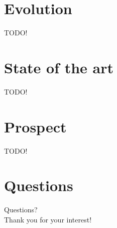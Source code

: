 \documentclass[10pt]{beamer}
\begin{document}
\section{Evolution}
\begin{frame}
	TODO!	
\end{frame}

\section{State of the art}
\begin{frame}
	TODO!	
\end{frame}

\section{Prospect}
\begin{frame}
	TODO!	
\end{frame}

\section{Questions}
\begin{frame}[standout]
	Questions? \\
	Thank you for your interest!
\end{frame}
\end{document}
